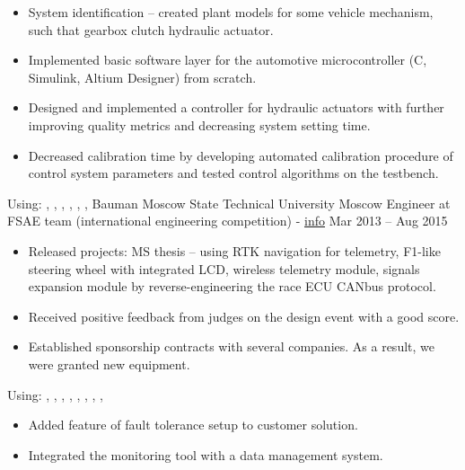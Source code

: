 \begin{itemize}
    \item System identification -- created plant models for some vehicle mechanism, such that gearbox clutch hydraulic actuator.
    \item Implemented basic software layer for the automotive microcontroller (C, Simulink, Altium Designer) from scratch.
    \item Designed and implemented a controller for hydraulic actuators with further improving quality metrics and decreasing system setting time.
    \item Decreased calibration time by developing automated calibration procedure of control system parameters and tested control algorithms on the testbench.
\end{itemize}
Using: , , , , , , 
\horizontalline
% 
\ressubheading
{Bauman Moscow State Technical University}
{}
{Moscow}
{Engineer at FSAE team (international engineering competition) - \href{https://baumanracing.ru/en/}{info}}
{Mar 2013 -- Aug 2015}
\begin{itemize}
    \item Released projects: MS thesis -- using RTK navigation for telemetry, F1-like steering wheel with integrated LCD, wireless telemetry module, signals expansion module by reverse-engineering the race ECU CANbus protocol.
    \item Received positive feedback from judges on the design event with a good score.
    \item Established sponsorship contracts with several companies. As a result, we were granted new equipment.
\end{itemize}
Using: , , , , , , , , 
\horizontalline
% 
\begin{itemize}
    \item Added feature of fault tolerance setup to customer solution.
    \item Integrated the monitoring tool with a data management system.
\end{itemize}
